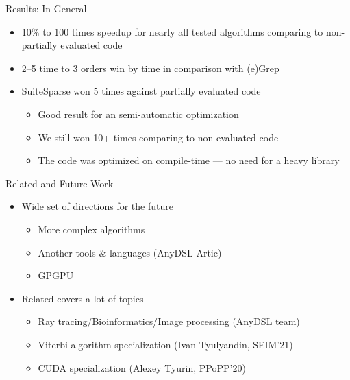 \documentclass{beamer}
\begin{document}
\begin{frame}{Results: In General}
		\begin{itemize}
			\item 10$\%$ to 100 times speedup for nearly all tested algorithms comparing to non-partially evaluated code
			\item 2--5 time to 3 orders win by time in comparison with (e)Grep
			\item SuiteSparse won 5 times against partially evaluated code
				\begin{itemize}
					\item Good result for an semi-automatic optimization
					\item We still won 10+ times comparing to non-evaluated code
					\item The code was optimized on compile-time --- no need for a heavy library
				\end{itemize}
		\end{itemize}
	
\end{frame}

\begin{frame}{Related and Future Work}
\begin{itemize}
	\item Wide set of directions for the future
	\begin{itemize}
		\item More complex algorithms
		\item Another tools \& languages (AnyDSL Artic)
		\item GPGPU
	\end{itemize}\vfill

	\item Related covers a lot of topics
	\begin{itemize}
		\item Ray tracing/Bioinformatics/Image processing (AnyDSL team)
		\item Viterbi algorithm specialization (Ivan Tyulyandin, SEIM'21)
		\item CUDA specialization (Alexey Tyurin, PPoPP'20)
	\end{itemize}
\end{itemize}
\end{frame}

\appendix
\end{document}

